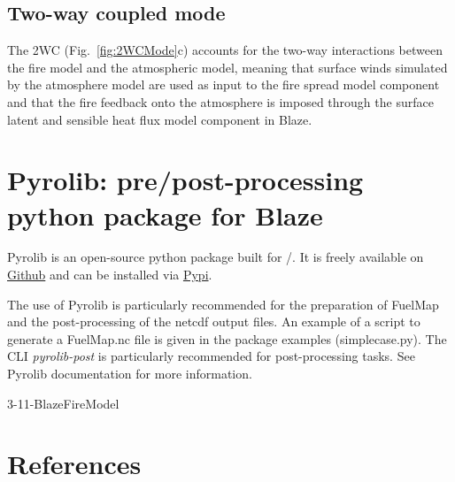 \subsection{Two-way coupled mode}
\label{ssec:cpl12WC}

The 2WC (Fig.~\ref{fig:2WCMode}c) accounts for the two-way interactions between the fire model and the atmospheric model, meaning that surface winds simulated by the atmosphere model are used as input to the fire spread model component and that the fire feedback onto the atmosphere is imposed through the surface latent and sensible heat flux model component in Blaze.

\section{Pyrolib: pre/post-processing python package for Blaze}

Pyrolib is an open-source python package built for \MNH/\Blaze.
It is freely available on \href{https://github.com/Aurel31/pyrolib}{Github} and can be installed via \href{https://pypi.org/project/pyrolib}{Pypi}. 

The use of Pyrolib is particularly recommended for the preparation of FuelMap and the post-processing of the netcdf output files.
An example of a script to generate a FuelMap.nc file is given in the package examples (simplecase.py).
The CLI \textit{pyrolib-post} is particularly recommended for post-processing tasks. See Pyrolib documentation for more information.  






\begin{btSect}{3-11-BlazeFireModel}
\section{References}
\btPrintCited
\end{btSect}
